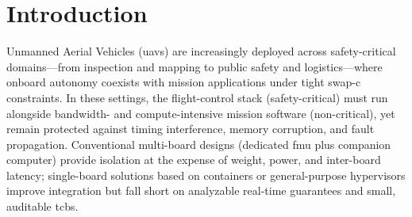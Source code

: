 %
%

%

\section{Introduction}
\label{sec:intro}
Unmanned Aerial Vehicles (\glspl{uav}) are increasingly deployed across
safety-critical domains—from inspection and mapping to public safety and
logistics—where onboard autonomy coexists with mission applications under tight
\gls{swap-c} constraints. In these settings, the flight-control stack
(safety-critical) must run alongside bandwidth- and compute-intensive mission
software (non-critical), yet remain protected against timing interference,
memory corruption, and fault propagation. Conventional multi-board designs
(dedicated \gls{fmu} plus companion computer) provide isolation at the expense
of weight, power, and inter-board latency; single-board solutions based on
containers or general-purpose hypervisors improve integration but fall short on
analyzable real-time guarantees and small, auditable \gls{tcb}s.

